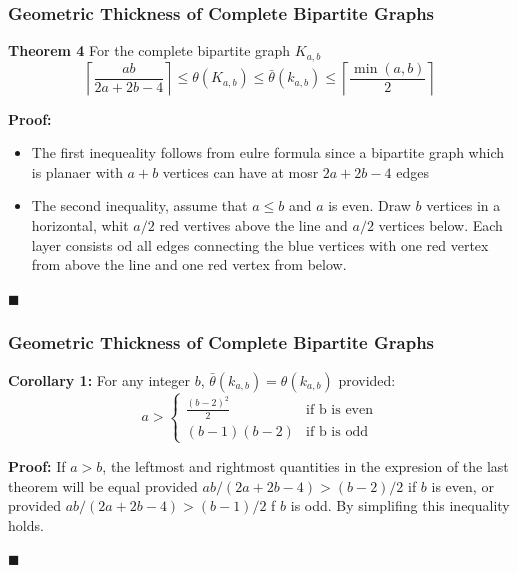 \documentclass[12 pt]{beamer}
\begin{document}
\begin{frame}{}
    \frametitle{Geometric Thickness of Complete Bipartite Graphs}
    
    \begin{block}{\textbf{Theorem 4}}
    For the complete bipartite graph $K_{a, b}$
    $$\left \lceil \frac{ab}{2a + 2b - 4} \right \rceil \leq \theta (K_{a,b}) \leq \bar{\theta} (k_{a,b}) \leq \left \lceil \frac{\min(a, b)}{2}  \right \rceil$$
    \end{block}
    
    \pause
    
    \textbf{Proof:}
    \begin{itemize}
    \item The first inequeality follows from eulre formula since a bipartite graph which is planaer with $a + b$ vertices can have at mosr $2a + 2b -4$ edges
    \item <2-> The second inequality, assume that $a \leq b$ and $a$ is even. Draw $b$ vertices in a horizontal, whit $a/2$ red vertives above the line and $a/2$ vertices below.
    Each layer consists od all edges connecting the blue vertices with one red vertex from above the line and one red vertex from below.
    \end{itemize}
    
    \begin{flushright}
    $\blacksquare$
    \end{flushright}
\end{frame}

\begin{frame}{}
    \frametitle{Geometric Thickness of Complete Bipartite Graphs}
    
    \begin{block}{\textbf{Corollary 1:}}
    For any integer $b$, $\bar{\theta} (k_{a,b}) = \theta (k_{a,b})$ provided:
    $$ a >
    \begin{cases}
    \frac{(b-2)^2}{2}  & \text{if b is even}\\
    (b-1)(b-2)  & \text{if b is odd}
    \end{cases}
    $$
    \end{block}
    
    \pause
    
    \textbf{Proof:}
    If $a > b$, the leftmost and rightmost quantities in the expresion of the last theorem will be equal provided $ab/(2a + 2b -4) > (b - 2)/2$ if $b$ is even, or provided  $ab/(2a + 2b -4) > (b - 1)/2$ f $b$ is odd. By simplifing this inequality holds.
    
    \begin{flushright}
    $\blacksquare$
    \end{flushright}
\end{frame}
\end{document}
